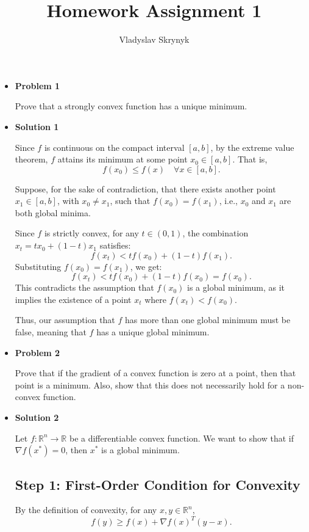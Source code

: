 \documentclass{article}
\begin{document}
\title{Homework Assignment 1}
\date{Vladyslav Skrynyk}
\maketitle

\begin{itemize}[label=\textbullet, itemsep=10pt]
    \item \textbf{Problem 1}
    
    {\fontsize{12}{14}\selectfont Prove that a strongly convex function has a unique minimum.}
    
    \item \textbf{Solution 1}
    
	Since $f$ is continuous on the compact interval $[a,b]$, by the extreme value theorem, $f$ attains its minimum at some point $x_0 \in [a,b]$. That is,
\[
f(x_0) \leq f(x) \quad \forall x \in [a,b].
\]

Suppose, for the sake of contradiction, that there exists another point $x_1 \in [a,b]$, with $x_0 \neq x_1$, such that $f(x_0) = f(x_1)$, i.e., $x_0$ and $x_1$ are both global minima.

Since $f$ is strictly convex, for any $t \in (0,1)$, the combination $x_t = t x_0 + (1-t) x_1$ satisfies:
\[
f(x_t) < t f(x_0) + (1-t) f(x_1).
\]
Substituting $f(x_0) = f(x_1)$, we get:
\[
f(x_t) < t f(x_0) + (1-t) f(x_0) = f(x_0).
\]
This contradicts the assumption that $f(x_0)$ is a global minimum, as it implies the existence of a point $x_t$ where $f(x_t) < f(x_0)$.

Thus, our assumption that $f$ has more than one global minimum must be false, meaning that $f$ has a unique global minimum. 
  
    
    \item \textbf{Problem 2}
    
    {\fontsize{12}{14}\selectfont Prove that if the gradient of a convex function is zero at a point, then that point is a minimum. Also, show that this does not necessarily hold for a non-convex function.}
    
    \item \textbf{Solution 2}

Let $f: \mathbb{R}^n \to \mathbb{R}$ be a differentiable convex function. We want to show that if $\nabla f(x^*) = 0$, then $x^*$ is a global minimum.

\subsection*{Step 1: First-Order Condition for Convexity}
By the definition of convexity, for any $x, y \in \mathbb{R}^n$,
\[
    f(y) \geq f(x) + \nabla f(x)^T (y - x).
\]


\end{itemize}
\end{document}
